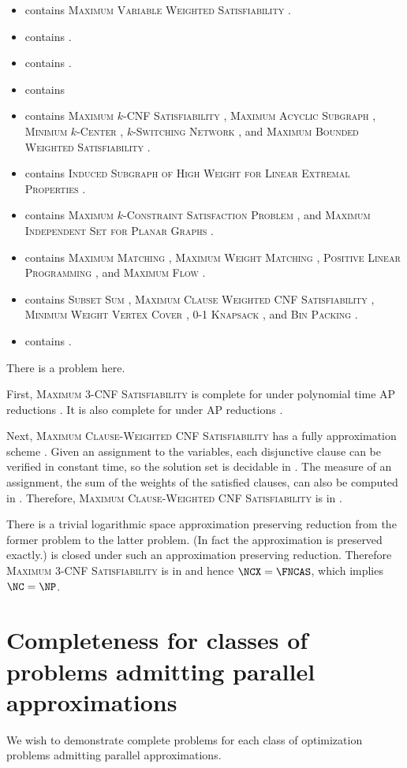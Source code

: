 \documentclass[]{article}
\newcommand{\nncoproblems}{%
  \textsc{Maximum Variable Weighted Satisfiability} \cite[Theorem~3.1]{om87} \cite[Theorem~8.3]{acgkmp99}}
\newcommand{\expapxncoproblems}{}
\newcommand{\polyapxncoproblems}{}
\newcommand{\logapxncoproblems}{}
\newcommand{\apxncoproblems}{%
  \textsc{Maximum $k$-CNF Satisfiability} \cite[Theorem~8.6]{acgkmp99},
  \textsc{Maximum Acyclic Subgraph} \cite[Section~7.4]{dsst97},
  \textsc{Minimum $k$-Center} \cite[Section~7.4]{dsst97},
  \textsc{$k$-Switching Network} \cite[Section~7.4]{dsst97}, and
  \textsc{Maximum Bounded Weighted Satisfiability} \cite[Theorem~4]{sx95}}
\newcommand{\apxncopproblems}{%
  \textsc{Induced Subgraph of High Weight for Linear Extremal Properties} \cite{dsst97}}
\newcommand{\ncasproblems}{%
  \textsc{Maximum $k$-Constraint Satisfaction Problem} \cite[Corollary~13]{trevisan98}, and
  \textsc{Maximum Independent Set for Planar Graphs} \cite[Theorem 6.4.1]{dsst97}}
\newcommand{\ncaspproblems}{%
  \textsc{Maximum Matching} \cite[Theorem~5.2.1]{dsst97},
  \textsc{Maximum Weight Matching} \cite[Theorem~5.2.2]{dsst97},
  \textsc{Positive Linear Programming} \cite[Theorem~5.1.11]{dsst97} \cite{tx98}, and
  \textsc{Maximum Flow} \cite[Theorem~5.2.2]{dsst97}}
\newcommand{\fncasproblems}{%
  \textsc{Subset Sum} \cite[Theorem~4.1.4]{dsst97},
  \textsc{Maximum Clause Weighted CNF Satisfiability} \cite[Theorem~8]{trevisan98},
  \textsc{Minimum Weight Vertex Cover} \cite[Theorem~5.3.6]{dsst97},
  \textsc{0-1 Knapsack} \cite[Theorem~2]{mayr88}, and
  \textsc{Bin Packing} \cite[Theorem~3]{mayr88}}
\newcommand{\ncoproblems}{}
\begin{document}
\begin{itemize}
\item \NNCO{} contains \nncoproblems.
\item \expApxNCO{} contains \expapxncoproblems.
\item \polyApxNCO{} contains \polyapxncoproblems.
\item \logApxNCO{} contains \logapxncoproblems
\item \ApxNCO{} contains \apxncoproblems.
\item \ApxNCOp{} contains \apxncopproblems.
\item \NCAS{} contains \ncasproblems.
\item \NCASp{} contains \ncaspproblems.
\item \FNCAS{} contains \fncasproblems.
\item \NCO{} contains \ncoproblems.
\end{itemize}

\begin{todo}
  There is a problem here.

  First, \textsc{Maximum 3-CNF Satisfiability} is complete for \APX{} under polynomial time AP reductions \cite[Theorem~8.6]{acgkmp99}.
  It is also complete for \NCX{} under \NC{} AP reductions \cite{finkelstein13b}.

  Next, \textsc{Maximum Clause-Weighted CNF Satisfiability} has a fully \NC{} approximation scheme \cite[Theorem~8]{trevisan98}.
  Given an assignment to the variables, each disjunctive clause can be verified in constant time, so the solution set is decidable in \NC{}.
  The measure of an assignment, the sum of the weights of the satisfied clauses, can also be computed in \NC{}.
  Therefore, \textsc{Maximum Clause-Weighted CNF Satisfiability} is in \FNCAS.

  There is a trivial logarithmic space approximation preserving reduction from the former problem to the latter problem.
  (In fact the approximation is preserved exactly.)
  \FNCAS{} is closed under such an approximation preserving reduction.
  Therefore \textsc{Maximum 3-CNF Satisfiability} is in \FNCAS and hence $\NCX = \FNCAS$, which implies $\NC = \NP$.
\end{todo}

\section{Completeness for classes of problems admitting parallel approximations}

We wish to demonstrate complete problems for each class of optimization problems admitting parallel approximations.
\end{document}
